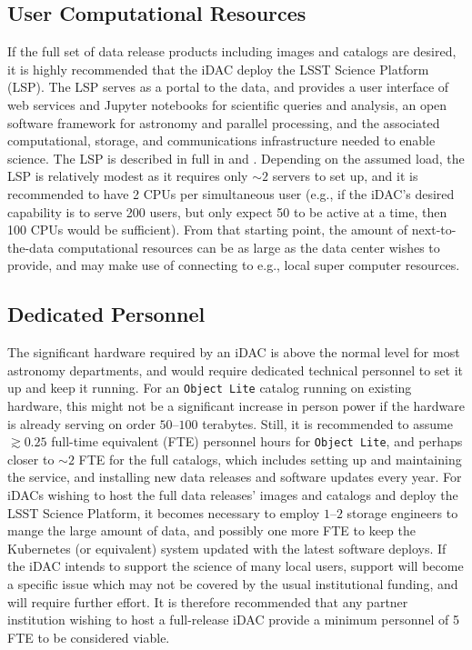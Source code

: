\subsection{User Computational Resources}
If the full set of data release products including images and catalogs are desired, it is highly recommended that the iDAC deploy the LSST Science Platform (LSP). The LSP serves as a portal to the data, and provides a user interface of web services and Jupyter notebooks for scientific queries and analysis, an open software framework for astronomy and parallel processing, and the associated computational, storage, and communications infrastructure needed to enable science. The LSP is described in full in  and . Depending on the assumed load, the LSP is relatively modest as it requires only $\sim2$ servers to set up, and it is recommended to have 2 CPUs per simultaneous user (e.g., if the iDAC's desired capability is to serve 200 users, but only expect 50 to be active at a time, then 100 CPUs would be sufficient). From that starting point, the amount of next-to-the-data computational resources can be as large as the data center wishes to provide, and may make use of connecting to e.g., local super computer resources.

\subsection{Dedicated Personnel}
The significant hardware required by an iDAC is above the normal level for most astronomy departments, and would require dedicated technical personnel to set it up and keep it running. For an {\tt Object Lite} catalog running on existing hardware, this might not be a significant increase in person power if the hardware is already serving on order $50$--$100$ terabytes. Still, it is recommended to assume $\gtrsim0.25$ full-time equivalent (FTE) personnel hours for {\tt Object Lite}, and perhaps closer to $\sim2$ FTE for the full catalogs, which includes setting up and maintaining the service, and installing new data releases and software updates every year. For iDACs wishing to host the full data releases' images and catalogs and deploy the LSST Science Platform, it becomes necessary to employ $1$--$2$ storage engineers to mange the large amount of data, and possibly one more FTE to keep the Kubernetes (or equivalent) system updated with the latest software deploys. If the iDAC intends to support the science of many local users, support will become a specific issue which may not be covered by the usual institutional funding, and will require further effort. It is therefore recommended that any partner institution wishing to host a full-release iDAC provide a minimum personnel of 5 FTE to be considered viable.


